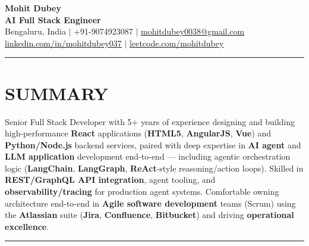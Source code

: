 \documentclass[100pt,a4paper]{article}
\newcommand{\sectionline}{
\begin{center}
\vspace{-10pt}
\rule{1\textwidth}{0.5pt}
\end{center}
\vspace{1pt}
}
\begin{document}
\begin{center}
    {\Huge\bfseries Mohit Dubey} \\ \vspace{4pt}
    \textbf{AI Full Stack Engineer } \\ \vspace{6pt}
    \small Bengaluru, India $|$ +91-9074923087 $|$ \href{mailto:mohitdubey0038@gmail.com}{\underline{mohitdubey0038@gmail.com}} \\
    \href{https://www.linkedin.com/in/mohit-dubey-037/}{\underline{linkedin.com/in/mohitdubey037}} $|$ \href{https://leetcode.com/u/mohitdubey037/}
    {\underline{leetcode.com/mohitdubey}}
\end{center}



\sectionline
\section*{SUMMARY}
Senior Full Stack Developer with 5+ years of experience designing and building high-performance \textbf{React} applications (\textbf{HTML5}, \textbf{AngularJS}, \textbf{Vue}) and \textbf{Python/Node.js} backend services, paired with deep expertise in \textbf{AI agent} and \textbf{LLM application} development end-to-end — including agentic orchestration logic (\textbf{LangChain}, \textbf{LangGraph}, \textbf{ReAct}-style reasoning/action loops). Skilled in \textbf{REST/GraphQL API integration}, agent tooling, and \textbf{observability/tracing} for production agent systems. Comfortable owning architecture end-to-end in \textbf{Agile software development} teams (Scrum) using the \textbf{Atlassian} suite (\textbf{Jira}, \textbf{Confluence}, \textbf{Bitbucket}) and driving \textbf{operational excellence}.




\sectionline
\end{document}
